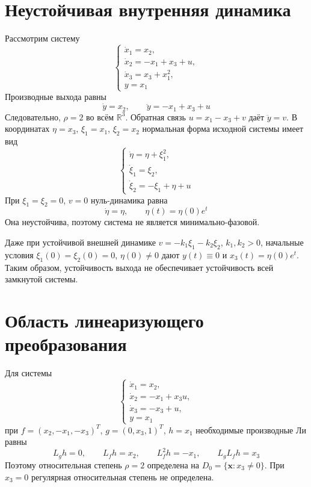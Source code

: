 \section{Неустойчивая внутренняя динамика}

Рассмотрим систему
\begin{equation}
  \begin{cases}
    \dot x_1=x_2,\\
    \dot x_2=-x_1+x_3+u,\\
    \dot x_3=x_3+x_1^2,\\
    y=x_1
  \end{cases}
\end{equation}
Производные выхода равны
\begin{equation}
  \dot y=x_2,\qquad \ddot y=-x_1+x_3+u
\end{equation}
Следовательно, $\rho=2$ во всём $\mathbb R^3$. Обратная связь
$u=x_1-x_3+v$ даёт $\ddot y=v$.
В координатах $\eta=x_3$, $\xi_1=x_1$, $\xi_2=x_2$
нормальная форма исходной системы имеет вид
\begin{equation}
  \begin{cases}
    \dot\eta=\eta+\xi_1^2,\\
    \dot \xi_1=\xi_2,\\
    \dot \xi_2=-\xi_1+\eta+u
  \end{cases}
\end{equation}
При $\xi_1=\xi_2=0$, $v=0$ нуль-динамика равна
\begin{equation}
  \dot\eta=\eta,\qquad \eta(t)=\eta(0)e^t
\end{equation}
Она неустойчива, поэтому система не является минимально-фазовой.

Даже при устойчивой внешней динамике
$v=-k_1\xi_1-k_2\xi_2$, $k_1,k_2>0$, начальные условия
$\xi_1(0)=\xi_2(0)=0$, $\eta(0)\ne0$ дают $y(t)\equiv0$ и
$x_3(t)=\eta(0)e^t$. Таким образом, устойчивость выхода
не обеспечивает устойчивость всей замкнутой системы.

\section{Область линеаризующего преобразования}

Для системы
\begin{equation}
  \begin{cases}
    \dot x_1=x_2,\\
    \dot x_2=-x_1+x_3u,\\
    \dot x_3=-x_3+u,\\
    y=x_1
  \end{cases}
\end{equation}
при $f=(x_2,-x_1,-x_3)^T$, $g=(0,x_3,1)^T$, $h=x_1$
необходимые производные Ли равны
\begin{equation}
  L_gh=0,\qquad L_fh=x_2,\qquad
  L_f^2h=-x_1,\qquad L_gL_fh=x_3
\end{equation}
Поэтому относительная степень $\rho=2$ определена на
$D_0=\{\bm x:x_3\ne0\}$. При $x_3=0$ регулярная относительная
степень не определена.

